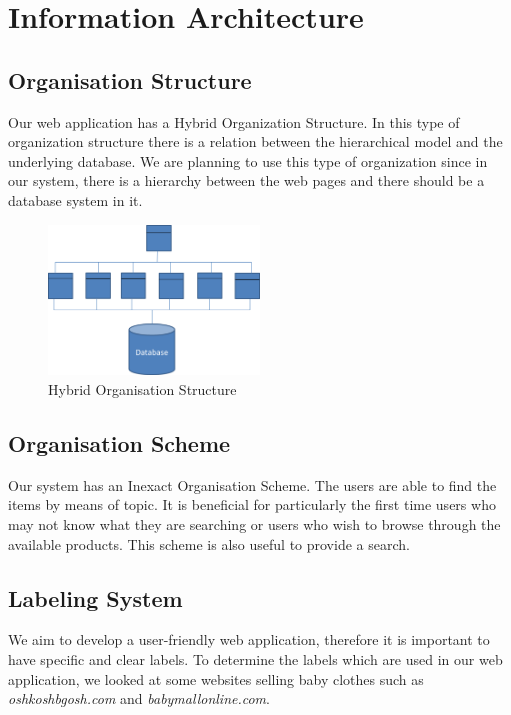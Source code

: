 \section{Information Architecture}

\subsection{Organisation Structure}
Our web application has a Hybrid Organization Structure. In this type of organization structure there is a relation between the hierarchical model and the underlying database. We are planning to use this type of organization since in our system, there is a hierarchy between the web pages and there should be a database system in it.

\begin{figure}[ht!]
  \centering
  \includegraphics[width=0.5\textwidth]{Images/hybrid_org.png}
  \caption{Hybrid Organisation Structure}
  \label{fig:hybrid_org}
\end{figure}


\subsection{Organisation Scheme}
Our system has an Inexact Organisation Scheme. The users are able to find the items by means of topic. It is beneficial for particularly the first time users who may not know what they are searching or users who wish to browse through the available products. This scheme is also useful to provide a search.

\subsection{Labeling System}\label{sec:labeling_system}
We aim to develop a user-friendly web application, therefore it is important to have specific and clear labels. To determine the labels which are used in our web application, we looked at some websites selling baby clothes such as \textit{oshkoshbgosh.com} and \textit{babymallonline.com}.

